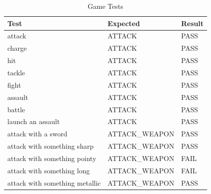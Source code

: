 \documentclass[11pt]{article}
\begin{document}
\begin{table}[]
\centering
\caption{Game Tests}
\label{table:game-scores}
\begin{tabular}{lll}
\multicolumn{1}{l|}{Test}                           & \multicolumn{1}{l|}{Expected}           & Result                       \\ \hline
\multicolumn{1}{l|}{attack}                         & \multicolumn{1}{l|}{ATTACK}             & \cellcolor[HTML]{67FD9A}PASS \\ \hline
\multicolumn{1}{l|}{charge}                         & \multicolumn{1}{l|}{ATTACK}             & \cellcolor[HTML]{67FD9A}PASS \\ \hline
\multicolumn{1}{l|}{hit}                            & \multicolumn{1}{l|}{ATTACK}             & \cellcolor[HTML]{67FD9A}PASS \\ \hline
\multicolumn{1}{l|}{tackle}                         & \multicolumn{1}{l|}{ATTACK}             & \cellcolor[HTML]{67FD9A}PASS \\ \hline
\multicolumn{1}{l|}{fight}                          & \multicolumn{1}{l|}{ATTACK}             & \cellcolor[HTML]{67FD9A}PASS \\ \hline
\multicolumn{1}{l|}{assault}                        & \multicolumn{1}{l|}{ATTACK}             & \cellcolor[HTML]{67FD9A}PASS \\ \hline
\multicolumn{1}{l|}{battle}                         & \multicolumn{1}{l|}{ATTACK}             & \cellcolor[HTML]{67FD9A}PASS \\ \hline
\multicolumn{1}{l|}{launch an assault}              & \multicolumn{1}{l|}{ATTACK}             & \cellcolor[HTML]{67FD9A}PASS \\ \hline
\multicolumn{1}{l|}{attack with a sword}            & \multicolumn{1}{l|}{ATTACK\_WEAPON}     & \cellcolor[HTML]{67FD9A}PASS \\ \hline
\multicolumn{1}{l|}{attack with something sharp}    & \multicolumn{1}{l|}{ATTACK\_WEAPON}     & \cellcolor[HTML]{67FD9A}PASS \\ \hline
\multicolumn{1}{l|}{attack with something pointy}   & \multicolumn{1}{l|}{ATTACK\_WEAPON}     & \cellcolor[HTML]{FD6864}FAIL \\ \hline
\multicolumn{1}{l|}{attack with something long}     & \multicolumn{1}{l|}{ATTACK\_WEAPON}     & \cellcolor[HTML]{FD6864}FAIL \\ \hline
\multicolumn{1}{l|}{attack with something metallic} & \multicolumn{1}{l|}{ATTACK\_WEAPON}     & \cellcolor[HTML]{67FD9A}PASS \\ \hline

\end{tabular}
\end{table}
\end{document}
